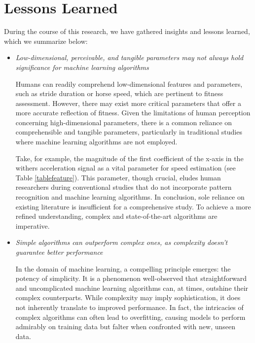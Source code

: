\section{Lessons Learned}
\label{sec:lessons_learned}

During the course of this research, we have gathered insights and lessons learned, which we summarize below:

\begin{itemize}[label={$\bullet$}, leftmargin=*]

\item{\textit{Low-dimensional, perceivable, and tangible parameters may not always hold significance for machine learning algorithms}}

Humans can readily comprehend low-dimensional features and parameters, such as stride duration or horse speed, which are pertinent to fitness assessment. However, there may exist more critical parameters that offer a more accurate reflection of fitness. Given the limitations of human perception concerning high-dimensional parameters, there is a common reliance on comprehensible and tangible parameters, particularly in traditional studies where machine learning algorithms are not employed. 

Take, for example, the magnitude of the first coefficient of the x-axis in the withers acceleration signal as a vital parameter for speed estimation (see Table \ref{tablefeature}). This parameter, though crucial, eludes human researchers during conventional studies that do not incorporate pattern recognition and machine learning algorithms. In conclusion, sole reliance on existing literature is insufficient for a comprehensive study. To achieve a more refined understanding, complex and state-of-the-art algorithms are imperative.

\item{\textit{Simple algorithms can outperform complex ones, as complexity doesn't guarantee better performance}}

In the domain of machine learning, a compelling principle emerges: the potency of simplicity. It is a phenomenon well-observed that straightforward and uncomplicated machine learning algorithms can, at times, outshine their complex counterparts. While complexity may imply sophistication, it does not inherently translate to improved performance. In fact, the intricacies of complex algorithms can often lead to overfitting, causing models to perform admirably on training data but falter when confronted with new, unseen data. 


\end{itemize}
